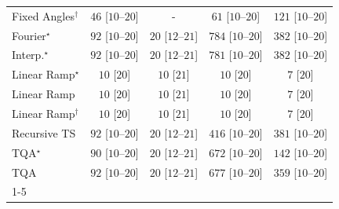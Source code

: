 \begin{tabular}{l|cccc|}
Fixed Angles$^\dagger$ & {\cellcolor[HTML]{EFF9EC}} \color[HTML]{000000} $46$ [$10$--$20$] & {\cellcolor[HTML]{000000}} \color[HTML]{F1F1F1} {\cellcolor{white}} \color{black} - & {\cellcolor[HTML]{ECF8E8}} \color[HTML]{000000} $61$ [$10$--$20$] & {\cellcolor[HTML]{DFF3DA}} \color[HTML]{000000} $121$ [$10$--$20$] \\
Fourier$^\star$ & {\cellcolor[HTML]{E7F6E2}} \color[HTML]{000000} $92$ [$10$--$20$] & {\cellcolor[HTML]{F4FBF2}} \color[HTML]{000000} $20$ [$12$--$21$] & {\cellcolor[HTML]{00441B}} \color[HTML]{F1F1F1} $784$ [$10$--$20$] & {\cellcolor[HTML]{79C67A}} \color[HTML]{000000} $382$ [$10$--$20$] \\
Interp.$^\star$ & {\cellcolor[HTML]{E7F6E2}} \color[HTML]{000000} $92$ [$10$--$20$] & {\cellcolor[HTML]{F4FBF2}} \color[HTML]{000000} $20$ [$12$--$21$] & {\cellcolor[HTML]{00441B}} \color[HTML]{F1F1F1} $781$ [$10$--$20$] & {\cellcolor[HTML]{79C67A}} \color[HTML]{000000} $382$ [$10$--$20$] \\
Linear Ramp$^\star$ & {\cellcolor[HTML]{F6FCF4}} \color[HTML]{000000} $10$ [$20$] & {\cellcolor[HTML]{F6FCF4}} \color[HTML]{000000} $10$ [$21$] & {\cellcolor[HTML]{F6FCF4}} \color[HTML]{000000} $10$ [$20$] & {\cellcolor[HTML]{F6FCF4}} \color[HTML]{000000} $7$ [$20$] \\
Linear Ramp & {\cellcolor[HTML]{F6FCF4}} \color[HTML]{000000} $10$ [$20$] & {\cellcolor[HTML]{F6FCF4}} \color[HTML]{000000} $10$ [$21$] & {\cellcolor[HTML]{F6FCF4}} \color[HTML]{000000} $10$ [$20$] & {\cellcolor[HTML]{F6FCF4}} \color[HTML]{000000} $7$ [$20$] \\
Linear Ramp$^\dagger$ & {\cellcolor[HTML]{F6FCF4}} \color[HTML]{000000} $10$ [$20$] & {\cellcolor[HTML]{F6FCF4}} \color[HTML]{000000} $10$ [$21$] & {\cellcolor[HTML]{F6FCF4}} \color[HTML]{000000} $10$ [$20$] & {\cellcolor[HTML]{F6FCF4}} \color[HTML]{000000} $7$ [$20$] \\
Recursive TS & {\cellcolor[HTML]{E7F6E2}} \color[HTML]{000000} $92$ [$10$--$20$] & {\cellcolor[HTML]{F4FBF2}} \color[HTML]{000000} $20$ [$12$--$21$] & {\cellcolor[HTML]{68BE70}} \color[HTML]{000000} $416$ [$10$--$20$] & {\cellcolor[HTML]{79C67A}} \color[HTML]{000000} $381$ [$10$--$20$] \\
TQA$^\star$ & {\cellcolor[HTML]{E7F6E3}} \color[HTML]{000000} $90$ [$10$--$20$] & {\cellcolor[HTML]{F4FBF2}} \color[HTML]{000000} $20$ [$12$--$21$] & {\cellcolor[HTML]{05712F}} \color[HTML]{F1F1F1} $672$ [$10$--$20$] & {\cellcolor[HTML]{D9F0D3}} \color[HTML]{000000} $142$ [$10$--$20$] \\
TQA & {\cellcolor[HTML]{E7F6E2}} \color[HTML]{000000} $92$ [$10$--$20$] & {\cellcolor[HTML]{F4FBF2}} \color[HTML]{000000} $20$ [$12$--$21$] & {\cellcolor[HTML]{03702E}} \color[HTML]{F1F1F1} $677$ [$10$--$20$] & {\cellcolor[HTML]{84CC83}} \color[HTML]{000000} $359$ [$10$--$20$] \\
\cline{1-5}
\bottomrule
\end{tabular}
